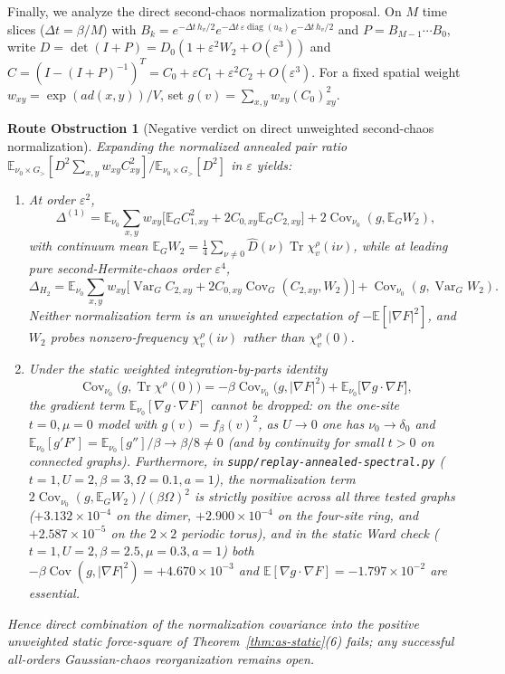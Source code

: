 \documentclass[11pt]{article}
\newtheorem{obstruction}[theorem]{Route Obstruction}
\theoremstyle{definition}
\theoremstyle{remark}
\DeclareMathOperator{\Tr}{Tr}
\DeclareMathOperator{\diag}{diag}
\DeclareMathOperator{\Cov}{Cov}
\DeclareMathOperator{\Var}{Var}
\newcommand{\E}{\mathbb{E}}
\begin{document}
Finally, we analyze the direct second-chaos normalization proposal. On $M$
time slices ($\Delta t = \beta/M$) with $B_k = e^{-\Delta t\,h_v/2} e^{-\Delta t\,\varepsilon \diag(u_k)} e^{-\Delta t\,h_v/2}$
and $P = B_{M-1}\cdots B_0$, write $D = \det(I + P) = D_0(1 + \varepsilon^2 W_2 + O(\varepsilon^3))$
and $C = (I - (I+P)^{-1})^T = C_0 + \varepsilon C_1 + \varepsilon^2 C_2 + O(\varepsilon^3)$.
For a fixed spatial weight $w_{xy} = \exp(a d(x,y))/V$, set $g(v) = \sum_{x,y} w_{xy} (C_0)_{xy}^2$.

\begin{obstruction}[Negative verdict on direct unweighted second-chaos normalization]
\label{obs:as-chaos}
Expanding the normalized annealed pair ratio $\E_{\nu_0 \times G_>}[D^2 \sum_{x,y} w_{xy} C_{xy}^2]/\E_{\nu_0 \times G_>}[D^2]$
in $\varepsilon$ yields:
\begin{enumerate}[leftmargin=1.5em]
\item At order $\varepsilon^2$,
\[
\Delta^{(1)}
= \E_{\nu_0}\sum_{x,y} w_{xy}\bigl[\E_G C_{1,xy}^2 + 2 C_{0,xy} \E_G C_{2,xy}\bigr]
+ 2\Cov_{\nu_0}(g, \E_G W_2),
\]
with continuum mean $\E_G W_2 = \frac{1}{4}\sum_{\nu \ne 0}\hat{D}(\nu)\Tr\chi_v^\rho(i\nu)$,
while at leading pure second-Hermite-chaos order $\varepsilon^4$,
\[
\Delta_{H_2}
= \E_{\nu_0}\sum_{x,y} w_{xy}\bigl[\Var_G C_{2,xy} + 2 C_{0,xy}\Cov_G(C_{2,xy}, W_2)\bigr]
+ \Cov_{\nu_0}(g, \Var_G W_2).
\]
Neither normalization term is an unweighted expectation of $-\E[|\nabla F|^2]$,
and $W_2$ probes nonzero-frequency $\chi_v^\rho(i\nu)$ rather than $\chi_v^\rho(0)$.
\item Under the static weighted integration-by-parts identity
\begin{equation}
\label{eq:as-ward}
\Cov_{\nu_0}\bigl(g, \Tr\chi^\rho(0)\bigr)
= -\beta\Cov_{\nu_0}\bigl(g, |\nabla F|^2\bigr) + \E_{\nu_0}\bigl[\nabla g \cdot \nabla F\bigr],
\end{equation}
the gradient term $\E_{\nu_0}[\nabla g \cdot \nabla F]$ cannot be dropped:
on the one-site $t=0, \mu=0$ model with $g(v) = f_\beta(v)^2$, as $U \to 0$
one has $\nu_0 \to \delta_0$ and $\E_{\nu_0}[g' F'] = \E_{\nu_0}[g'']/\beta \to \beta/8 \ne 0$
(and by continuity for small $t > 0$ on connected graphs). Furthermore, in
\texttt{supp/replay-annealed-spectral.py} ($t=1, U=2, \beta=3, \Omega=0.1, a=1$),
the normalization term $2\Cov_{\nu_0}(g, \E_G W_2)/(\beta\Omega)^2$ is strictly
positive across all three tested graphs ($+3.132\times 10^{-4}$ on the dimer,
$+2.900\times 10^{-4}$ on the four-site ring, and $+2.587\times 10^{-5}$ on the
$2\times 2$ periodic torus), and in the static Ward check ($t=1, U=2, \beta=2.5, \mu=0.3, a=1$)
both $-\beta\Cov(g, |\nabla F|^2) = +4.670\times 10^{-3}$ and $\E[\nabla g \cdot \nabla F] = -1.797\times 10^{-2}$
are essential.
\end{enumerate}
Hence direct combination of the normalization covariance into the positive
unweighted static force-square of Theorem~\ref{thm:as-static}(6) fails; any
successful all-orders Gaussian-chaos reorganization remains open.
\end{obstruction}
\end{document}
